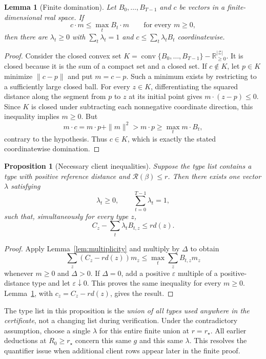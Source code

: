 \documentclass[11pt]{article}
\numberwithin{equation}{section}
\newtheorem{lemma}[theorem]{Lemma}
\newtheorem{proposition}[theorem]{Proposition}
\theoremstyle{definition}
\newcommand{\R}{\mathbb R}
\newcommand{\calR}{\mathcal R}
\newcommand{\rstar}{r_\star}
\newcommand{\Rzero}{R_0}
\DeclareMathOperator{\conv}{conv}
\begin{document}
\begin{lemma}[Finite domination]\label{lem:domination}
Let $B_0,\ldots,B_{T-1}$ and $c$ be vectors in a finite-dimensional real
space. If
\[
 c\cdot m\le\max_t B_t\cdot m\qquad\text{for every }m\ge0,
\]
then there are $\lambda_t\ge0$ with $\sum_t\lambda_t=1$ and
$c\le\sum_t\lambda_t B_t$ coordinatewise.
\end{lemma}
\begin{proof}
Consider the closed convex set
$K=\conv\{B_0,\ldots,B_{T-1}\}-\R_{\ge0}^{|\mathcal Z|}$.
It is closed because it is the sum of a compact set and a closed set.
If $c\notin K$, let $p\in K$ minimize $\|c-p\|$ and put $m=c-p$.
Such a minimum exists by restricting to a sufficiently large closed ball.
For every $z\in K$, differentiating the squared distance along the segment
from $p$ to $z$ at its initial point gives $m\cdot(z-p)\le0$.
Since $K$ is closed under subtracting each nonnegative coordinate direction,
this inequality implies $m\ge0$. But
\[
 m\cdot c=m\cdot p+\|m\|^2>m\cdot p\ge\max_t m\cdot B_t,
\]
contrary to the hypothesis. Thus $c\in K$, which is exactly the stated
coordinatewise domination.
\end{proof}

\begin{proposition}[Necessary client inequalities]\label{prop:dual}
Suppose the type list contains a type with positive reference distance and
$\calR(\beta)\le r$. Then there exists one vector $\lambda$ satisfying
\begin{equation}\label{eq:lambda}
 \lambda_t\ge0,\qquad\sum_{t=0}^{T-1}\lambda_t=1,
\end{equation}
such that, simultaneously for every type $z$,
\begin{equation}\label{eq:clientdual}
 C_z-\sum_t\lambda_tB_{t,z}\le r d(z).
\end{equation}
\end{proposition}
\begin{proof}
Apply Lemma~\ref{lem:multiplicity} and multiply by $\Delta$ to obtain
\[
 \sum_z(C_z-rd(z))m_z\le\max_t\sum_zB_{t,z}m_z
\]
whenever $m\ge0$ and $\Delta>0$. If $\Delta=0$, add a positive
$\varepsilon$ multiple of a positive-distance type and let
$\varepsilon\downarrow0$. This proves the same inequality for every
$m\ge0$. Lemma~\ref{lem:domination}, with $c_z=C_z-rd(z)$, gives the result.
\end{proof}

The type list in this proposition is the \emph{union of all types used
anywhere in the certificate}, not a changing list during verification.
Under the contradictory assumption, choose a single $\lambda$ for this
entire finite union at $r=\rstar$. All earlier deductions at
$\Rzero\ge\rstar$ concern this same $g$ and this same $\lambda$.
This resolves the quantifier issue when additional client rows appear later
in the finite proof.
\end{document}
